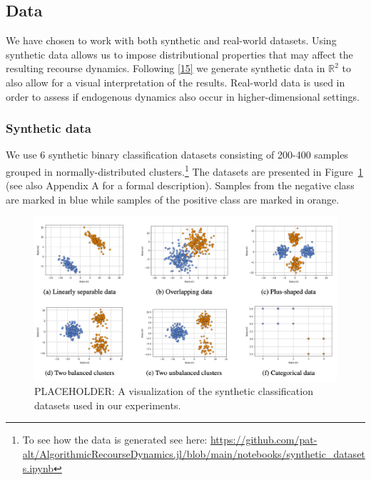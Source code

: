 \documentclass[
  conference]{IEEEtran}
\begin{document}
\hypertarget{sec-method-data}{%
\subsection{Data}\label{sec-method-data}}

We have chosen to work with both synthetic and real-world datasets.
Using synthetic data allows us to impose distributional properties that
may affect the resulting recourse dynamics. Following
\protect\hyperlink{ref-upadhyay2021towards}{{[}15{]}} we generate
synthetic data in \(\mathbb{R}^2\) to also allow for a visual
interpretation of the results. Real-world data is used in order to
assess if endogenous dynamics also occur in higher-dimensional settings.

\hypertarget{synthetic-data}{%
\subsubsection{Synthetic data}\label{synthetic-data}}

We use 6 synthetic binary classification datasets consisting of 200-400
samples grouped in normally-distributed clusters.\footnote{To see how
  the data is generated see here:
  \url{https://github.com/pat-alt/AlgorithmicRecourseDynamics.jl/blob/main/notebooks/synthetic_datasets.ipynb}}
The datasets are presented in Figure~\ref{fig-synthetic-data} (see also
Appendix A for a formal description). Samples from the negative class
are marked in blue while samples of the positive class are marked in
orange.

\begin{figure}

{\centering \includegraphics{www/synthetic_data.png}

}

\caption{\label{fig-synthetic-data}PLACEHOLDER: A visualization of the
synthetic classification datasets used in our experiments.}

\end{figure}
\end{document}
